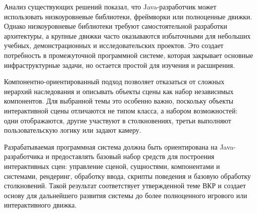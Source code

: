 Анализ существующих решений показал, что Java-разработчик может
использовать низкоуровневые библиотеки, фреймворки или полноценные
движки. Однако низкоуровневые библиотеки требуют самостоятельной
разработки архитектуры, а крупные движки часто оказываются избыточными
для небольших учебных, демонстрационных и исследовательских проектов.
Это создает потребность в промежуточной программной системе, которая
закрывает основные инфраструктурные задачи, но остается простой для
изучения и расширения.

Компонентно-ориентированный подход позволяет отказаться от сложных
иерархий наследования и описывать объекты сцены как набор независимых
компонентов. Для выбранной темы это особенно важно, поскольку объекты
интерактивной сцены отличаются не типом класса, а набором возможностей:
одни отображаются, другие участвуют в столкновениях, третьи выполняют
пользовательскую логику или задают камеру.

Разрабатываемая программная система должна быть ориентирована на
Java-разработчика и предоставлять базовый набор средств для построения
интерактивных сцен: управление сценой, сущностями, компонентами и
системами, рендеринг, обработку ввода, скрипты поведения и базовую
обработку столкновений. Такой результат соответствует утвержденной теме
ВКР и создает основу для дальнейшего развития системы до более
полноценного игрового или интерактивного движка.
